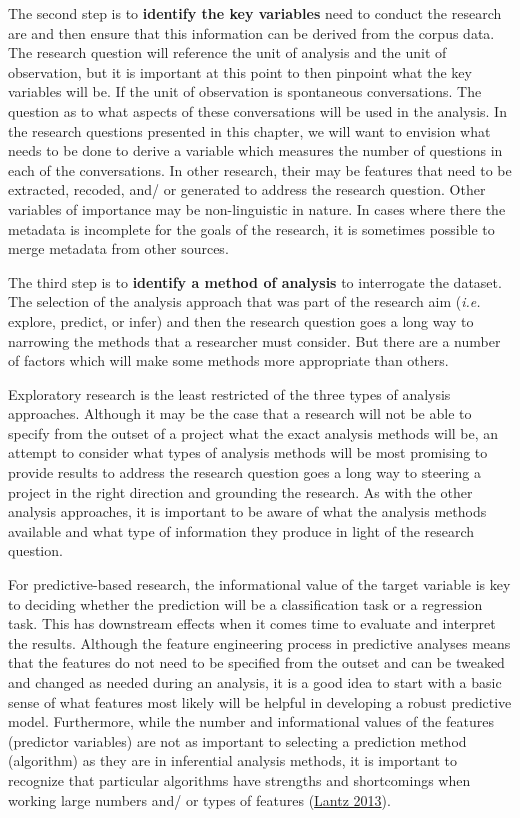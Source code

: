 \documentclass[
  letterpaper,
  DIV=11,
  numbers=noendperiod]{scrreport}
\theoremstyle{definition}
\theoremstyle{remark}
\begin{document}
The second step is to \textbf{identify the key variables} need to
conduct the research are and then ensure that this information can be
derived from the corpus data. The research question will reference the
unit of analysis and the unit of observation, but it is important at
this point to then pinpoint what the key variables will be. If the unit
of observation is spontaneous conversations. The question as to what
aspects of these conversations will be used in the analysis. In the
research questions presented in this chapter, we will want to envision
what needs to be done to derive a variable which measures the number of
questions in each of the conversations. In other research, their may be
features that need to be extracted, recoded, and/ or generated to
address the research question. Other variables of importance may be
non-linguistic in nature. In cases where there the metadata is
incomplete for the goals of the research, it is sometimes possible to
merge metadata from other sources.

The third step is to \textbf{identify a method of analysis} to
interrogate the dataset. The selection of the analysis approach that was
part of the research aim (\emph{i.e.} explore, predict, or infer) and
then the research question goes a long way to narrowing the methods that
a researcher must consider. But there are a number of factors which will
make some methods more appropriate than others.

Exploratory research is the least restricted of the three types of
analysis approaches. Although it may be the case that a research will
not be able to specify from the outset of a project what the exact
analysis methods will be, an attempt to consider what types of analysis
methods will be most promising to provide results to address the
research question goes a long way to steering a project in the right
direction and grounding the research. As with the other analysis
approaches, it is important to be aware of what the analysis methods
available and what type of information they produce in light of the
research question.

For predictive-based research, the informational value of the target
variable is key to deciding whether the prediction will be a
classification task or a regression task. This has downstream effects
when it comes time to evaluate and interpret the results. Although the
feature engineering process in predictive analyses means that the
features do not need to be specified from the outset and can be tweaked
and changed as needed during an analysis, it is a good idea to start
with a basic sense of what features most likely will be helpful in
developing a robust predictive model. Furthermore, while the number and
informational values of the features (predictor variables) are not as
important to selecting a prediction method (algorithm) as they are in
inferential analysis methods, it is important to recognize that
particular algorithms have strengths and shortcomings when working large
numbers and/ or types of features
(\protect\hyperlink{ref-Lantz2013}{Lantz 2013}).
\end{document}
